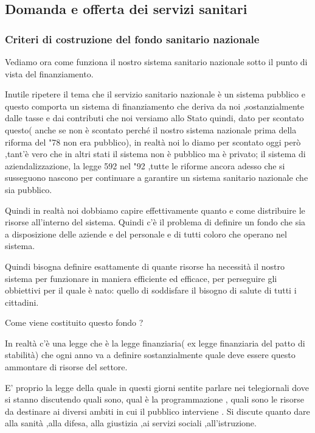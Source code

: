 \subsection{Domanda e offerta dei servizi sanitari}

\subsubsection{Criteri di costruzione del fondo sanitario nazionale}

Vediamo ora come funziona il nostro sistema sanitario nazionale sotto il
punto di vista del finanziamento.

Inutile ripetere il tema che il servizio sanitario nazionale è un
sistema pubblico e questo comporta un sistema di finanziamento che
deriva da noi ,sostanzialmente dalle tasse e dai contributi che noi
versiamo allo Stato quindi, dato per scontato questo( anche se non è
scontato perché il nostro sistema nazionale prima della riforma del "78
non era pubblico), in realtà noi lo diamo per scontato oggi però ,tant'è
vero che in altri stati il sistema non è pubblico ma è privato; il
sistema di aziendalizzazione, la legge 592 nel "92 ,tutte le riforme
ancora adesso che si susseguono nascono per continuare a garantire un
sistema sanitario nazionale che sia pubblico.

Quindi in realtà noi dobbiamo capire effettivamente quanto e come
distribuire le risorse all'interno del sistema. Quindi c'è il problema
di definire un fondo che sia a disposizione delle aziende e del
personale e di tutti coloro che operano nel sistema.

Quindi bisogna definire esattamente di quante risorse ha necessità il
nostro sistema per funzionare in maniera efficiente ed efficace, per
perseguire gli obbiettivi per il quale è nato: quello di soddisfare il
bisogno di salute di tutti i cittadini.

Come viene costituito questo fondo ?

In realtà c'è una legge che è la legge finanziaria( ex legge finanziaria
del patto di stabilità) che ogni anno va a definire sostanzialmente
quale deve essere questo ammontare di risorse del settore.

E' proprio la legge della quale in questi giorni sentite parlare nei
telegiornali dove si stanno discutendo quali sono, qual è la
programmazione , quali sono le risorse da destinare ai diversi ambiti in
cui il pubblico interviene . Si discute quanto dare alla sanità ,alla
difesa, alla giustizia ,ai servizi sociali ,all'istruzione.

